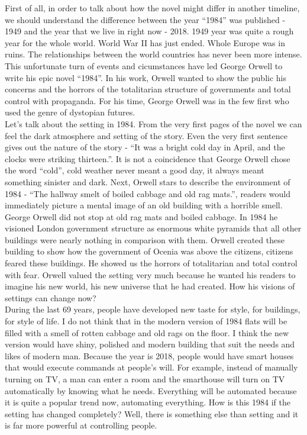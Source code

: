\documentclass[a4paper,12pt]{article}
\begin{document}

First of all, in order to talk about how the novel might differ in another timeline, we should understand the difference between the year ``1984'' was published - 1949 and the year that we live in right now - 2018. 1949 year was quite a rough year for the whole world. World War II has just ended. Whole Europe was in ruins. The relationships between the world countries has never been more intense. This unfortunate turn of events and cicumstances have led George Orwell to write his epic novel ``1984''. In his work, Orwell wanted to show the public his concerns and the horrors of the totalitarian structure of governments and total control with propaganda. For his time, George Orwell was in the few first who used the genre of dystopian futures.\\

Let's talk about the setting in 1984. From the very first pages of the novel we can feel the dark atmosphere and setting of the story. Even the very first sentence gives out the nature of the story - ``It was a bright cold day in April, and the clocks were striking thirteen.''. It is not a coincidence that George Orwell chose the word ``cold'', cold weather never meant a good day, it always meant something sinister and dark. Next, Orwell stars to describe the environment of 1984 - ``The hallway smelt of boiled cabbage and old rag mats.'', readers would immediately picture a mental image of an old building with a horrible smell. George Orwell did not stop at old rag mats and boiled cabbage. In 1984 he visioned London government structure as enormous white pyramids that all other buildings were nearly nothing in comparison with them. Orwell created these building to show how the government of Ocenia was above the citizens, citizens feared these buildings. He showed us the horrors of totalitarian and total control with fear. Orwell valued the setting very much because he wanted his readers to imagine his new world, his new universe that he had created. How his visions of settings can change now?\\


During the last 69 years, people have developed new taste for style, for buildings, for style of life. I do not think that in the modern version of 1984 flats will be filled with a smell of rotten cabbage and old rags on the floor. I think the new version would have shiny, polished and modern building that suit the needs and likes of modern man. Because the year is 2018, people would have smart houses that would execute commands at people's will. For example, instead of manually turning on TV, a man can enter a room and the smarthouse will turn on TV automatically by knowing what he needs. Everything will be automated because it is quite a popular trend now, automating everything. How is this 1984 if the setting has changed completely? Well, there is something else than setting and it is far more powerful at controlling people.\\
\end{document}
